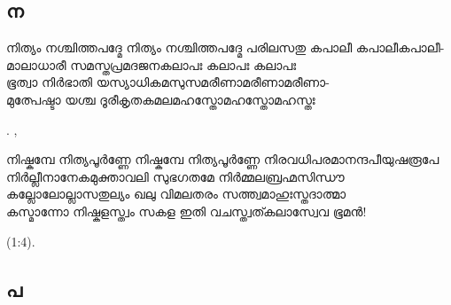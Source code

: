 \subsection{ന}

\begin{enumerate}


\begin{slokam}{\VSr}{\KVIT}{നിത്യം നശ്ചിത്തപദ്മേ}
 നിത്യം നശ്ചിത്തപദ്മേ പരിലസതു കപാലീ കപാലീകപാലീ-\\
മാലാധാരീ സമസ്തപ്രമദജനകലാപഃ കലാപഃ കലാപഃ\\
ഭൂത്വാ നിർഭാതി യസ്യാധികമസുസമരീണാമരീണാമരീണാ-\\
മുത്പേഷ്ടാ യശ്ച ദൂരീകൃതകമലമഹസ്തോമഹസ്തോമഹസ്തഃ
\end{slokam}


.  ,




\begin{slokam}{\VSr}{\Melp}{നിഷ്കമ്പേ നിത്യപൂർ‌ണ്ണേ}
നിഷ്കമ്പേ നിത്യപൂർ‌ണ്ണേ നിരവധിപരമാനന്ദപീയുഷരൂപേ\\
നിർല്ലീനാനേകമുക്താവലി സുഭഗതമേ നിർ‌മ്മലബ്രഹ്മസിന്ധൗ\\
കല്ലോലോല്ലാസതുല്യം ഖലു വിമലതരം സത്ത്വമാഹുഃസ്തദാത്മാ\\
കസ്മാന്നോ നിഷ്കളസ്ത്വം സകള ഇതി വചസ്ത്വത്കലാസ്വേവ ഭൂമൻ!
\end{slokam}


 (1:4).


\end{enumerate}




\subsection{പ}

